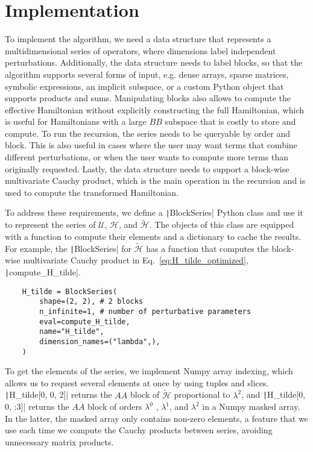 \section{Implementation}

To implement the algorithm, we need a data structure that represents a
multidimensional series of operators, where dimensions label independent
perturbations.
Additionally, the data structure needs to label blocks, so that the algorithm
supports several forms of input, e.g. dense arrays, sparse matrices, symbolic
expressions, an implicit subspace, or a custom Python object that supports
products and sums.
Manipulating blocks also allows to compute the effective Hamiltonian without
explicitly constructing the full Hamiltonian, which is useful for Hamiltonians
with a large $BB$ subspace that is costly to store and compute.
To run the recursion, the series needs to be queryable by order and block.
This is also useful in cases where the user may want terms that combine
different perturbations, or when the user wants to compute more terms than
originally requested.
Lastly, the data structure needs to support a block-wise multivariate Cauchy
product, which is the main operation in the recursion and is used to compute
the transformed Hamiltonian.

To address these requirements, we define a \texttt|BlockSeries|
Python class and use it to represent the series of $\mathcal{U}$,
$\mathcal{H}$, and $\tilde{\mathcal{H}}$.
The objects of this class are equipped with a function to compute their elements
and a dictionary to cache the results.
For example, the \texttt|BlockSeries| for $\tilde{\mathcal{H}}$ has
a function that computes the block-wise multivariate Cauchy product in
Eq.~\eqref{eq:H_tilde_optimized}, \texttt|compute_H_tilde|.
%
\begin{verbatim}
    H_tilde = BlockSeries(
        shape=(2, 2), # 2 blocks
        n_infinite=1, # number of perturbative parameters
        eval=compute_H_tilde,
        name="H_tilde",
        dimension_names=("lambda",),
    )
\end{verbatim}
%
To get the elements of the series, we implement Numpy array indexing,
which allows us to request several elements at once by using tuples and slices.
\texttt|H_tilde[0, 0, 2]| returns the $AA$ block of
$\tilde{\mathcal{H}}$ proportional to $\lambda^2$, and
\texttt|H_tilde[0, 0, :3]| returns the $AA$ block of orders
$\lambda^0$ , $\lambda^1$, and $\lambda^2$ in a Numpy masked array.
In the latter, the masked array only contains non-zero elements, a feature that
we use each time we compute the Cauchy products between series, avoiding
unnecessary matrix products.

